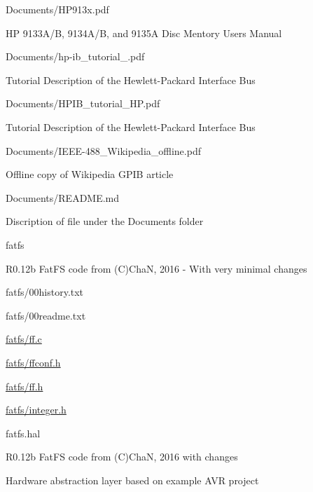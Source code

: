 \begin{DoxyItemize}
\begin{DoxyItemize}
\end{DoxyItemize}
\item Documents/\+H\+P913x.\+pdf
\begin{DoxyItemize}
\item HP 9133\+A/B, 9134\+A/B, and 9135A Disc Mentory Users Manual
\end{DoxyItemize}
\item Documents/hp-\/ib\+\_\+tutorial\+\_.\+pdf
\begin{DoxyItemize}
\item Tutorial Description of the Hewlett-\/\+Packard Interface Bus
\end{DoxyItemize}
\item Documents/\+H\+P\+I\+B\+\_\+tutorial\+\_\+\+H\+P.\+pdf
\begin{DoxyItemize}
\item Tutorial Description of the Hewlett-\/\+Packard Interface Bus
\end{DoxyItemize}
\item Documents/\+I\+E\+E\+E-\/488\+\_\+\+Wikipedia\+\_\+offline.\+pdf
\begin{DoxyItemize}
\item Offline copy of Wikipedia G\+P\+IB article
\end{DoxyItemize}
\item Documents/\+R\+E\+A\+D\+M\+E.\+md
\begin{DoxyItemize}
\item Discription of file under the Documents folder
\end{DoxyItemize}
\item fatfs
\begin{DoxyItemize}
\item R0.\+12b Fat\+FS code from (C)ChaN, 2016 -\/ With very minimal changes
\item fatfs/00history.\+txt
\item fatfs/00readme.\+txt
\item \hyperlink{ff_8c}{fatfs/ff.\+c}
\item \hyperlink{ffconf_8h}{fatfs/ffconf.\+h}
\item \hyperlink{ff_8h}{fatfs/ff.\+h}
\item \hyperlink{integer_8h}{fatfs/integer.\+h}
\end{DoxyItemize}
\item fatfs.\+hal
\begin{DoxyItemize}
\item R0.\+12b Fat\+FS code from (C)ChaN, 2016 with changes
\item Hardware abstraction layer based on example A\+VR project

\end{DoxyItemize}
\end{DoxyItemize}

